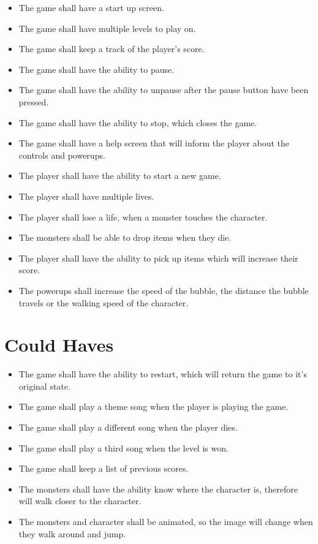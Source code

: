 \begin{itemize}
\itemsep0em 
	 \item The game shall have a start up screen.
	 \item The game shall have multiple levels to play on.
	 \item The game shall keep a track of the player's score.
	 \item The game shall have the ability to pause.
	 \item The game shall have the ability to unpause after the pause button have been pressed.
	 \item The game shall have the ability to stop, which closes the game.
	 \item The game shall have a help screen that will inform the player about the controls and powerups.
	 \item The player shall have the ability to start a new game.
	 \item The player shall have multiple lives.
	 \item The player shall lose a life, when a monster touches the character. 
	 \item The monsters shall be able to drop items when they die.
	 \item The player shall have the ability to pick up items which will increase their score.
	 \item The powerups shall increase the speed of the bubble, the distance the bubble travels or the walking speed of the character.
\end{itemize}

\section{Could Haves}

\begin{itemize}
\itemsep0em 
	  \item The game shall have the ability to restart, which will return the game to it's original state.
	  \item The game shall play a theme song when the player is playing the game.
	  \item The game shall play a different song when the player dies.
	  \item The game shall play a third song when the level is won.
	  \item The game shall keep a list of previous scores.
	  \item The monsters shall have the ability know where the character is, therefore will walk closer to the character.
	  \item The monsters and character shall be animated, so the image will change when they walk around and jump.
\end{itemize}

